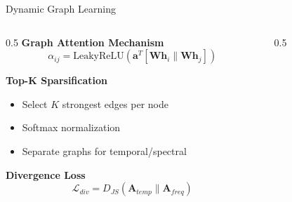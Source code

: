 \documentclass[aspectratio=169,11pt]{beamer}
\begin{document}
\begin{frame}{Dynamic Graph Learning}
    \begin{columns}
        \begin{column}{0.5\textwidth}
            \textbf{Graph Attention Mechanism}
            \begin{equation*}
                \alpha_{ij} = \text{LeakyReLU}\left(\mathbf{a}^T [\mathbf{W}\mathbf{h}_i \| \mathbf{W}\mathbf{h}_j]\right)
            \end{equation*}

            \vspace{0.3cm}
            \textbf{Top-K Sparsification}
            \begin{itemize}
                \item Select $K$ strongest edges per node
                \item Softmax normalization
                \item Separate graphs for temporal/spectral
            \end{itemize}

            \vspace{0.3cm}
            \textbf{Divergence Loss}
            \begin{equation*}
                \mathcal{L}_{div} = D_{JS}(\mathbf{A}_{temp} \| \mathbf{A}_{freq})
            \end{equation*}
        \end{column}
        \begin{column}{0.5\textwidth}
            
        \end{column}
    \end{columns}
\end{frame}
\end{document}
